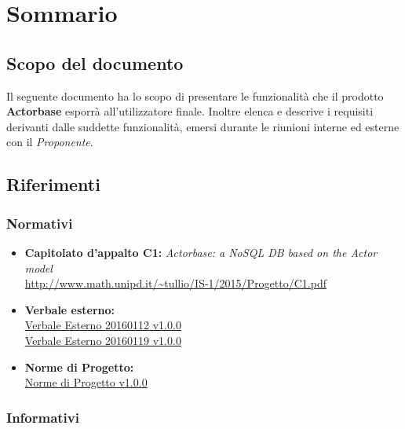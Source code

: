 \documentclass{scalatekids-article}
\begin{document}
\section{Sommario}

\subsection{Scopo del documento}

Il seguente documento ha lo scopo di presentare le funzionalità che il prodotto
\textbf{Actorbase} esporrà all'utilizzatore finale. Inoltre elenca e descrive i
requisiti derivanti dalle suddette funzionalità, emersi durante le riunioni
interne ed esterne con il \textit{Proponente}.
\prodPurpose{}\glossExpl{}

\subsection{Riferimenti}

\subsubsection{Normativi}

\begin{itemize}
\item\textbf{Capitolato d'appalto C1:} \textit{Actorbase: a NoSQL DB based on the Actor model}\\
  \url{http://www.math.unipd.it/~tullio/IS-1/2015/Progetto/C1.pdf}
\item\textbf{Verbale esterno:}\\
  \href{run:../RR/Interni/VerbaleEsterno20160112\_v1.0.0.pdf}{Verbale Esterno 20160112 v1.0.0}\\
  \href{run:../RR/Interni/VerbaleEsterno20160119\_v1.0.0.pdf}{Verbale Esterno 20160119 v1.0.0}
\item\textbf{Norme di Progetto:}\\
  \href{run:../Interni/NormeDiProgetto\_v1.0.0.pdf}{Norme di Progetto v1.0.0}
\end{itemize}

\subsubsection{Informativi}
\end{document}
